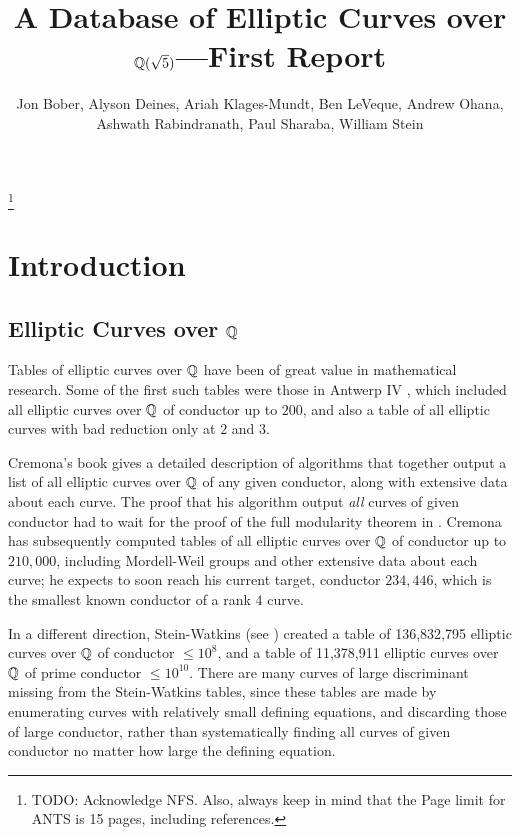 \documentclass{amsart}
\title{A Database of Elliptic Curves over $\mathbb{Q}(\sqrt{5})$---First Report}
\author[Bober et al.]{Jon Bober, Alyson Deines, Ariah Klages-Mundt, Ben
  LeVeque, Andrew Ohana, Ashwath Rabindranath, Paul Sharaba, William
  Stein}
\begin{document}
\begin{abstract} 
\end{abstract} 

\maketitle

\footnote{TODO: Acknowledge NFS.  Also, always keep in mind that the
  Page limit for ANTS is 15 pages, including references.}

\section{Introduction}\label{sec:intro}

\subsection{Elliptic Curves over $\mathbb{Q}$}
Tables of elliptic curves over $\mathbb{Q}$ have been of great value in
mathematical research.  Some of the first such tables were those in
Antwerp IV \cite{antwerpiv}, which included all elliptic curves over
$\mathbb{Q}$ of conductor up to $200$, and also a table of all elliptic curves
with bad reduction only at $2$ and $3$.  

Cremona's book \cite{cremona:algs} gives a detailed description of
algorithms that together output a list of all elliptic curves over
$\mathbb{Q}$ of any given conductor, along with extensive data about each
curve.  The proof that his algorithm output {\em all} curves of given
conductor had to wait for the proof of the full modularity theorem in
\cite{breuil-conrad-diamond-taylor}.  Cremona has subsequently
computed tables \cite{cremona:onlinetables} of all elliptic curves
over $\mathbb{Q}$ of conductor up to $210,\!000$, including Mordell-Weil
groups and other extensive data about each curve; he expects to soon
reach his current target, conductor $234,\!446$, which is the smallest
known conductor of a rank $4$ curve.

In a different direction, Stein-Watkins (see \cite{stein-watkins:ants5, bmsw:bulletins}) 
created a table of 136,832,795 elliptic curves over $\mathbb{Q}$ of conductor $\leq 10^8$, and a
table of 11,378,911 elliptic curves over $\mathbb{Q}$ of prime conductor $\leq
10^{10}$. 
There are many curves of large discriminant missing from the
Stein-Watkins tables, since these tables are made by enumerating
curves with relatively small defining equations, and discarding those
of large conductor, rather than systematically finding all curves of
given conductor no matter how large the defining equation.
\end{document}

